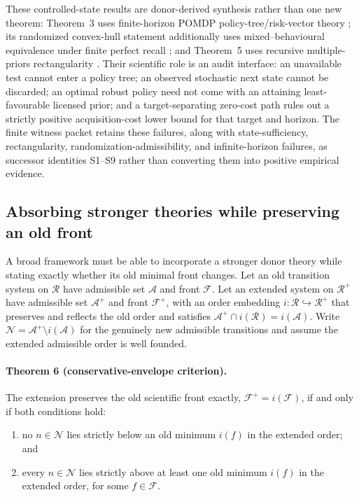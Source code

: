 These controlled-state results are donor-derived synthesis rather than one new
theorem: Theorem~3 uses finite-horizon POMDP policy-tree/risk-vector theory
\cite{smallwood1973}; its randomized convex-hull statement additionally uses
mixed--behavioural equivalence under finite perfect recall \cite{kuhn1953}; and
Theorem~5 uses recursive multiple-priors rectangularity \cite{epstein2003}.
Their scientific role is an audit interface: an unavailable test cannot enter
a policy tree; an observed stochastic next state cannot be discarded; an
optimal robust policy need not come with an attaining least-favourable licensed
prior; and a target-separating zero-cost path rules out a strictly positive
acquisition-cost lower bound for that target and horizon. The finite witness
packet retains these failures, along with
state-sufficiency, rectangularity, randomization-admissibility, and
infinite-horizon failures, as successor identities S1--S9 rather than
converting them into positive empirical evidence.

\subsection{Absorbing stronger theories while preserving an old front}

A broad framework must be able to incorporate a stronger donor theory while
stating exactly whether its old minimal front changes. Let an old transition system on
$\mathcal R$ have admissible set $\mathcal A$ and front $\mathcal F$. Let an
extended system on $\mathcal R^+$ have admissible set $\mathcal A^+$ and front
$\mathcal F^+$, with an order embedding $i:\mathcal R\hookrightarrow
\mathcal R^+$ that preserves and reflects the old order and satisfies
$\mathcal A^+\cap i(\mathcal R)=i(\mathcal A)$. Write
$\mathcal N=\mathcal A^+\setminus i(\mathcal A)$ for the genuinely new
admissible transitions and assume the extended admissible order is well
founded.

\paragraph{Theorem 6 (conservative-envelope criterion).}
The extension preserves the old scientific front exactly,
$\mathcal F^+=i(\mathcal F)$, if and only if both conditions hold:
\begin{enumerate}
  \item no $n\in\mathcal N$ lies strictly below an old minimum $i(f)$ in the
  extended order; and
  \item every $n\in\mathcal N$ lies strictly above at least one old minimum $i(f)$
  in the extended order,
  for some $f\in\mathcal F$.
\end{enumerate}

